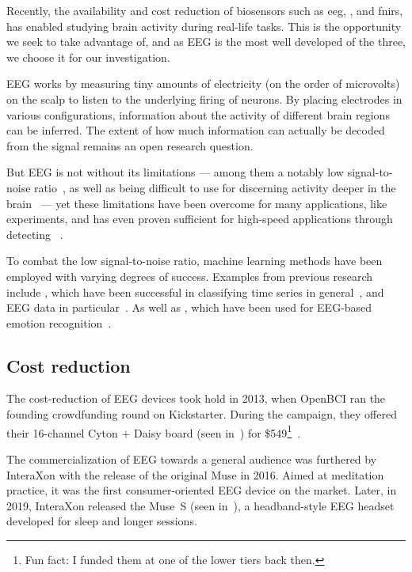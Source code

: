     Recently, the availability and cost reduction of biosensors such as \gls{eeg}, , and \gls{fnirs}, has enabled studying brain activity during real-life tasks. This is the opportunity we seek to take advantage of, and as EEG is the most well developed of the three, we choose it for our investigation.

    EEG works by measuring tiny amounts of electricity (on the order of microvolts) on the scalp to listen to the underlying firing of neurons. By placing electrodes in various configurations, information about the activity of different brain regions can be inferred. The extent of how much information can actually be decoded from the signal remains an open research question.

    But EEG is not without its limitations --- among them a notably low signal-to-noise ratio~\cite{mcfarland_eeg-based_2017}, as well as being difficult to use for discerning activity deeper in the brain~\cite{fahimi_hnazaee_localization_2020} --- yet these limitations have been overcome for many applications, like  experiments, and has even proven sufficient for high-speed  applications through detecting ~\cite{spuler_high-speed_2017}.

    To combat the low signal-to-noise ratio, machine learning methods have been employed with varying degrees of success. Examples from previous research include , which have been successful in classifying time series in general~\cite{zhao_convolutional_2017}, and EEG data in particular~\cite{schirrmeister_deep_2017}. As well as , which have been used for EEG-based emotion recognition~\cite{li_hierarchical_2018}.

    \subsection*{Cost reduction}

    The cost-reduction of EEG devices took hold in 2013, when OpenBCI ran the founding crowdfunding round on Kickstarter. During the campaign, they offered their 16-channel Cyton + Daisy board (seen in~) for \$549\footnote{Fun fact: I funded them at one of the lower tiers back then.}~\cite{noauthor_openbci_nodate}.

    The commercialization of EEG towards a general audience was furthered by InteraXon with the release of the original Muse in 2016. Aimed at meditation practice, it was the first consumer-oriented EEG device on the market. Later, in 2019, InteraXon released the Muse~S (seen in~), a headband-style EEG headset developed for sleep and longer sessions.

